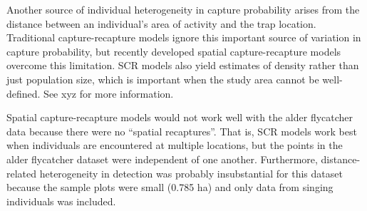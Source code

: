 \documentclass[a4paper]{article}
\begin{document}
Another source of individual heterogeneity in capture probability
arises from the distance between an individual's area of activity and
the trap location. Traditional capture-recapture models ignore this
important source of variation in capture probability, but
recently developed spatial capture-recapture models overcome this
limitation. SCR models also yield estimates of density rather than
just population size, which is important when the study area cannot be
well-defined. See xyz for
more information.

Spatial capture-recapture models would not work well with the alder
flycatcher data because there were no ``spatial recaptures''. That is,
SCR models work best when individuals are encountered at multiple
locations, but the points in the alder flycatcher dataset were
independent of one another. Furthermore,
distance-related heterogeneity in detection was probably insubstantial
for this dataset because
the sample plots were small (0.785 ha) and only data from
singing individuals was included.


\end{document}
